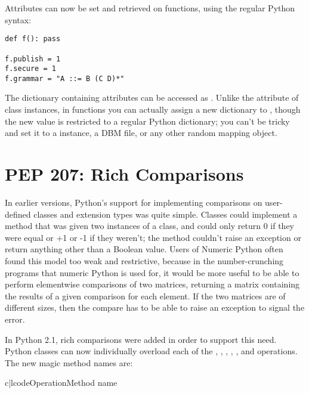 \documentclass{howto}
\begin{document}
Attributes can now be set and retrieved on functions, using the
regular Python syntax:

\begin{verbatim}
def f(): pass

f.publish = 1
f.secure = 1
f.grammar = "A ::= B (C D)*"
\end{verbatim}    

The dictionary containing attributes can be accessed as
. Unlike the  attribute of
class instances, in functions you can actually assign a new dictionary
to , though the new value is restricted to a
regular Python dictionary; you can't be tricky and set it to a
 instance, a DBM file, or any other random mapping
object.

\section{PEP 207: Rich Comparisons}

In earlier versions, Python's support for implementing comparisons on
user-defined classes and extension types was quite simple. Classes
could implement a  method that was given two instances
of a class, and could only return 0 if they were equal or +1 or -1 if
they weren't; the method couldn't raise an exception or return
anything other than a Boolean value.  Users of Numeric Python often
found this model too weak and restrictive, because in the
number-crunching programs that numeric Python is used for, it would be
more useful to be able to perform elementwise comparisons of two
matrices, returning a matrix containing the results of a given
comparison for each element.  If the two matrices are of different
sizes, then the compare has to be able to raise an exception to signal
the error.

In Python 2.1, rich comparisons were added in order to support this need.
Python classes can now individually overload each of the \code{<},
\code{<=}, \code{>}, \code{>=}, \code{==}, and \code{!=} operations.
The new magic method names are:

\begin{tableii}{c|l}{code}{Operation}{Method name}
\end{tableii}
\end{document}
